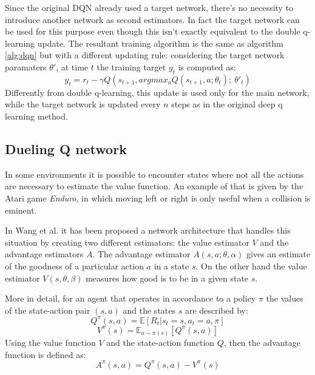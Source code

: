\documentclass[article,11pt]{article}
\begin{document}
	Since the original DQN already used a target network, there's no necessity to introduce another network as second estimators. In fact the target network can be used for this purpose even though this isn't exactly equivalent to the double q-learning update. The resultant training algorithm is the same as algorithm \ref{alg:dqn} but with a different updating rule: considering the target network paramaters $\theta'$, at time $t$ the training target $y_t$ is computed as:
	\begin{equation}
		y_t = r_t - \gamma Q(s_{t+1}, argmax_aQ(s_{t+1}, a; \theta_t);\ \theta'_t)
	\end{equation}
	Differently from double q-learning, this update is used only for the main network, while the target network is updated every $n$ steps as in the original deep q learning method.
	
	\subsection{Dueling Q network}
	In some environments it is possible to encounter states where not all the actions are necessary to estimate the value function. An example of that is given by the Atari game \textit{Enduro}, in which moving left or right is only useful when a collision is eminent.
	
	In Wang et al. \cite{duelingdqn} it has been proposed a network architecture that handles this situation by creating two different estimators: the value estimator $V$ and the advantage estimators $A$. The advantage estimator $A(s,a;\theta,\alpha)$ gives an estimate of the goodness of a particular action $a$ in a state $s$. On the other hand the value estimator $V(s,\theta,\beta)$ measures how good is to be in a given state $s$.
	
	More in detail, for an agent that operates in accordance to a policy $\pi$ the values of the state-action pair $(s,a)$ and the states $s$ are described by:
	\begin{equation}
		Q^\pi(s,a) = \mathbb{E}\left[R_t | s_t = s, a_t = a, \pi \right]
	\end{equation}
	\begin{equation}
		V^\pi(s) = \mathbb{E}_{a\sim \pi(s)} \left[ Q^\pi(s,a)\right]
	\end{equation}
	Using the value function $V$ and the state-action function $Q$, then the advantage function is defined as:
	\begin{equation}
		A^\pi(s,a) = Q^\pi(s,a) - V^\pi(s)
	\end{equation}
	
\end{document}
